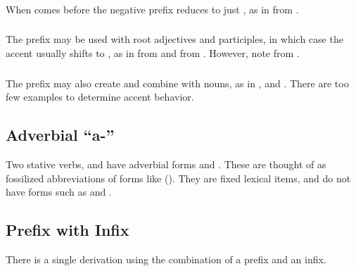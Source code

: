 \subsubsection{} When  comes before  the negative prefix
reduces to just , as in   from
 .

\subsubsection{} The  prefix may be used with root adjectives
and participles, in which case the accent usually shifts to ,
as in   from   and
  from  .  However,
note   from  .
\label{lingop:prefix:ke}

\subsubsection{} The  prefix may also create and combine with
nouns, as in  , and 
.  There are too few examples to determine accent behavior.


\subsection{Adverbial ``a-''} Two stative verbs,  
and   have adverbial forms   and  .  These are
thought of as fossilized abbreviations of forms like  ().  They are fixed lexical items, and do
not have forms such as  and .


\subsection{Prefix with Infix} There is a single derivation using the
combination of a prefix and an infix.

